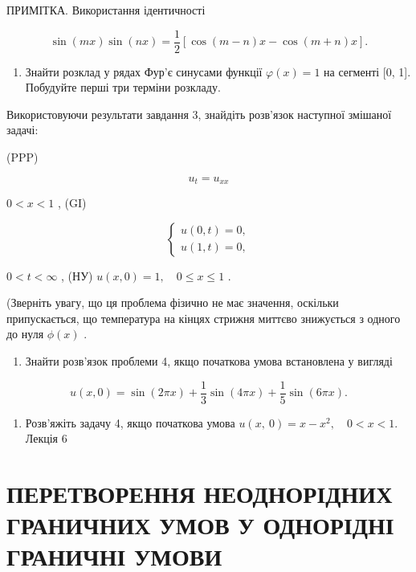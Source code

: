 \documentclass[
  ukrainian,
]{article}
\providecommand{\tightlist}{%
  \setlength{\itemsep}{0pt}\setlength{\parskip}{0pt}}
\begin{document}
ПРИМІТКА. Використання ідентичності

\[
\sin(mx)\sin(nx) = \frac{1}{2}[\cos(m-n)x - \cos(m+n)x].
\]

\begin{enumerate}
\def\labelenumi{\arabic{enumi}.}
\setcounter{enumi}{2}
\tightlist
\item
  Знайти розклад у рядах Фур'є синусами функції \(\varphi(x) = 1\) на
  сегменті {[}0, 1{]}. Побудуйте перші три терміни розкладу.
\end{enumerate}

Використовуючи результати завдання 3, знайдіть розв'язок наступної
змішаної задачі:

(PPP)

\[
u_t = u_{xx}
\]

\(0 < x < 1\) , (GI)

\[
\begin{cases} u(0, t) = 0, \\ u(1, t) = 0, \end{cases}
\]

\(0 < t < \infty\) , (НУ) \(u(x, 0) = 1, \quad 0 \le x \le 1\) .

(Зверніть увагу, що ця проблема фізично не має значення, оскільки
припускається, що температура на кінцях стрижня миттєво знижується з
одного до нуля \(\phi(x)\) .

\begin{enumerate}
\def\labelenumi{\arabic{enumi}.}
\setcounter{enumi}{4}
\tightlist
\item
  Знайти розв'язок проблеми 4, якщо початкова умова встановлена у
  вигляді
\end{enumerate}

\[
u(x, 0) = \sin(2\pi x) + \frac{1}{3}\sin(4\pi x) + \frac{1}{5}\sin(6\pi x).
\]

\begin{enumerate}
\def\labelenumi{\arabic{enumi}.}
\setcounter{enumi}{5}
\tightlist
\item
  Розв'яжіть задачу 4, якщо початкова умова
  \(u\left( x,\ 0\right) =x-x^{2},\quad 0< x<1.\) Лекція 6
\end{enumerate}

\section{ПЕРЕТВОРЕННЯ НЕОДНОРІДНИХ ГРАНИЧНИХ УМОВ У ОДНОРІДНІ ГРАНИЧНІ
УМОВИ}\label{ux43fux435ux440ux435ux442ux432ux43eux440ux435ux43dux43dux44f-ux43dux435ux43eux434ux43dux43eux440ux456ux434ux43dux438ux445-ux433ux440ux430ux43dux438ux447ux43dux438ux445-ux443ux43cux43eux432-ux443-ux43eux434ux43dux43eux440ux456ux434ux43dux456-ux433ux440ux430ux43dux438ux447ux43dux456-ux443ux43cux43eux432ux438}
\end{document}
